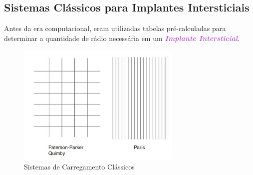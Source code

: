 \documentclass[11pt,a4paper]{article}
\begin{document}
		
\subsection*{Sistemas Clássicos para Implantes Intersticiais}

			Antes da era computacional, eram utilizadas tabelas pré-calculadas para determinar a quantidade de rádio necessária em um \textit{\textbf{\textcolor{MediumOrchid}{Implante Intersticial}}}.

			\begin{figure}[h]
				\centering
				\includegraphics[width=0.7\textwidth]{Imagens/carregamentosHistoricos.JPG}
				\caption{Sistemas de Carregamento Clássicos}
				\label{img:carregamentosHistoricos}
			\end{figure} 
\end{document}
